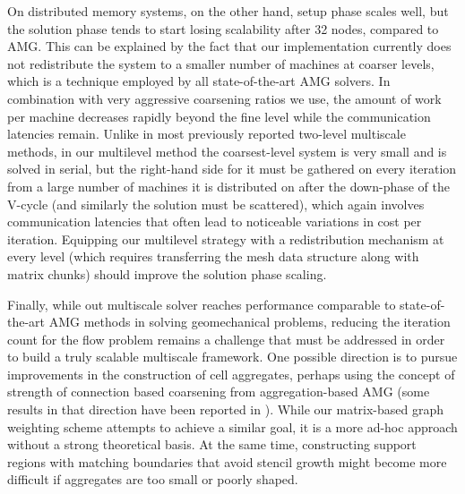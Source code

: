 On distributed memory systems, on the other hand, setup phase scales well, but the solution phase tends to start losing scalability after 32 nodes, compared to AMG.   This can be explained by the fact that our implementation currently does not redistribute the system to a smaller number of machines at coarser levels, which is a technique employed by all state-of-the-art AMG solvers.   In combination with very aggressive coarsening ratios we use, the amount of work per machine decreases rapidly beyond the fine level while the communication latencies remain.   Unlike in most previously reported two-level multiscale methods, in our multilevel method the coarsest-level system is very small and is solved in serial, but the right-hand side for it must be gathered on every iteration from a large number of machines it is distributed on after the down-phase of the V-cycle (and similarly the solution must be scattered), which again involves communication latencies that often lead to noticeable variations in cost per iteration.   Equipping our multilevel strategy with a redistribution mechanism at every level (which requires transferring the mesh data structure along with matrix chunks) should improve the solution phase scaling.

Finally, while out multiscale solver reaches performance comparable to state-of-the-art AMG methods in solving geomechanical problems, reducing the iteration count for the flow problem remains a challenge that must be addressed in order to build a truly scalable multiscale framework.   One possible direction is to pursue improvements in the construction of cell aggregates, perhaps using the concept of strength of connection based coarsening from aggregation-based AMG (some results in that direction have been reported in \cite{Nilsen2020}).   While our matrix-based graph weighting scheme attempts to achieve a similar goal, it is a more ad-hoc approach without a strong theoretical basis.   At the same time, constructing support regions with matching boundaries that avoid stencil growth might become more difficult if aggregates are too small or poorly shaped.

